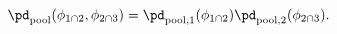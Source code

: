 \begin{equation}
  \pd_{\text{pool}} (\phi_{1 \cap 2}, \phi_{2 \cap 3}) = \pd_{\text{pool}, 1}(\phi_{1 \cap 2}) \pd_{\text{pool}, 2}(\phi_{2 \cap 3}).
  \label{eqn:silly-linear-overall}
\end{equation}